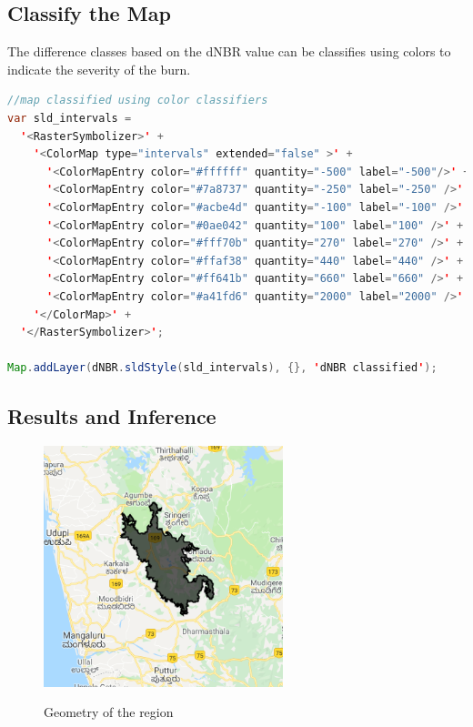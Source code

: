 \documentclass[12pt]{svproc}
\begin{document}
\subsection{Classify the Map}

The difference classes based on the dNBR value can be classifies using colors to indicate the severity of the burn.
\begin{lstlisting}[language=Java, caption=Calculate dNBR]
//map classified using color classifiers
var sld_intervals =
  '<RasterSymbolizer>' +
    '<ColorMap type="intervals" extended="false" >' +
      '<ColorMapEntry color="#ffffff" quantity="-500" label="-500"/>' +
      '<ColorMapEntry color="#7a8737" quantity="-250" label="-250" />' +
      '<ColorMapEntry color="#acbe4d" quantity="-100" label="-100" />' +
      '<ColorMapEntry color="#0ae042" quantity="100" label="100" />' +
      '<ColorMapEntry color="#fff70b" quantity="270" label="270" />' +
      '<ColorMapEntry color="#ffaf38" quantity="440" label="440" />' +
      '<ColorMapEntry color="#ff641b" quantity="660" label="660" />' +
      '<ColorMapEntry color="#a41fd6" quantity="2000" label="2000" />' +
    '</ColorMap>' +
  '</RasterSymbolizer>';
  
Map.addLayer(dNBR.sldStyle(sld_intervals), {}, 'dNBR classified');
\end{lstlisting}


\subsection{Results and Inference}

\begin{figure}{}
	\includegraphics[width=0.5\linewidth, height=7cm]{geo.png} 
	\label{fig:subim1}
	\centering
	\caption{Geometry of the region}
\end{figure}
\end{document}
